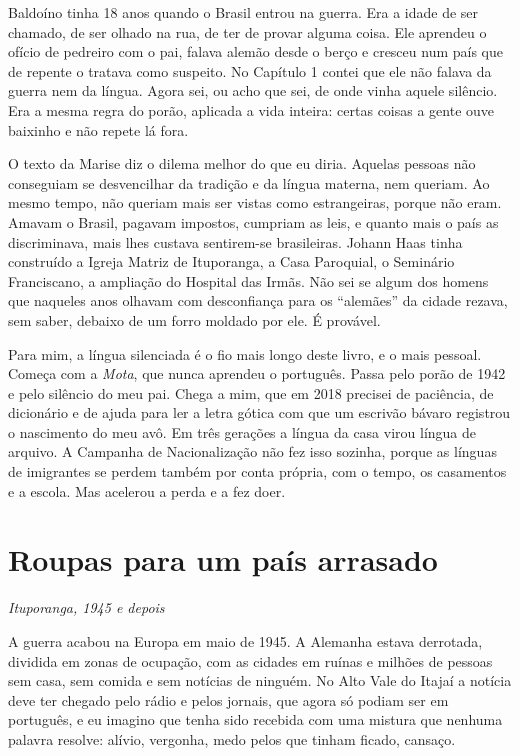 \documentclass[
  brazilian,
  11pt,
  openany]{book}
\begin{document}
Baldoíno tinha 18 anos quando o Brasil entrou na guerra. Era a idade de
ser chamado, de ser olhado na rua, de ter de provar alguma coisa. Ele
aprendeu o ofício de pedreiro com o pai, falava alemão desde o berço e
cresceu num país que de repente o tratava como suspeito. No Capítulo 1
contei que ele não falava da guerra nem da língua. Agora sei, ou acho
que sei, de onde vinha aquele silêncio. Era a mesma regra do porão,
aplicada a vida inteira: certas coisas a gente ouve baixinho e não
repete lá fora.

O texto da Marise diz o dilema melhor do que eu diria. Aquelas pessoas
não conseguiam se desvencilhar da tradição e da língua materna, nem
queriam. Ao mesmo tempo, não queriam mais ser vistas como estrangeiras,
porque não eram. Amavam o Brasil, pagavam impostos, cumpriam as leis, e
quanto mais o país as discriminava, mais lhes custava sentirem-se
brasileiras. Johann Haas tinha construído a Igreja Matriz de Ituporanga,
a Casa Paroquial, o Seminário Franciscano, a ampliação do Hospital das
Irmãs. Não sei se algum dos homens que naqueles anos olhavam com
desconfiança para os ``alemães'' da cidade rezava, sem saber, debaixo de
um forro moldado por ele. É provável.

Para mim, a língua silenciada é o fio mais longo deste livro, e o mais
pessoal. Começa com a \emph{Mota}, que nunca aprendeu o português. Passa
pelo porão de 1942 e pelo silêncio do meu pai. Chega a mim, que em 2018
precisei de paciência, de dicionário e de ajuda para ler a letra gótica
com que um escrivão bávaro registrou o nascimento do meu avô. Em três
gerações a língua da casa virou língua de arquivo. A Campanha de
Nacionalização não fez isso sozinha, porque as línguas de imigrantes se
perdem também por conta própria, com o tempo, os casamentos e a escola.
Mas acelerou a perda e a fez doer.

\section{Roupas para um país
arrasado}\label{roupas-para-um-pauxeds-arrasado}

\emph{Ituporanga, 1945 e depois}

A guerra acabou na Europa em maio de 1945. A Alemanha estava derrotada,
dividida em zonas de ocupação, com as cidades em ruínas e milhões de
pessoas sem casa, sem comida e sem notícias de ninguém. No Alto Vale do
Itajaí a notícia deve ter chegado pelo rádio e pelos jornais, que agora
só podiam ser em português, e eu imagino que tenha sido recebida com uma
mistura que nenhuma palavra resolve: alívio, vergonha, medo pelos que
tinham ficado, cansaço.
\end{document}
